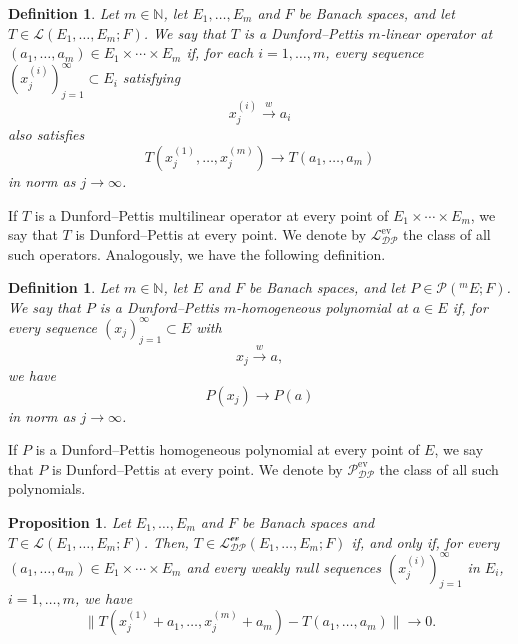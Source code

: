 \documentclass[12 pt]{article}%
\newtheorem{proposition}[theorem]{Proposition}
\newtheorem{final remark}[theorem]{Final Remark}
\newtheorem{definition}[theorem]{Definition}
\begin{document}
\begin{definition}\label{DPML}
	Let $m \in \mathbb{N}$, let $E_1,\dots, E_m$ and $F$ be Banach spaces, and let $T \in \mathcal{L}(E_1,\dots, E_m; F)$. We say that $T$ is a Dunford–Pettis $m$-linear operator at $(a_1,\dots, a_m) \in E_1 \times \cdots \times E_m$ if, for each $i=1,\dots,m$, every sequence $(x_j^{(i)})_{j=1}^\infty \subset E_i$ satisfying
	\[
	x_j^{(i)} \overset{w}{\longrightarrow} a_i
	\]
	also satisfies
	\[
	T(x_j^{(1)},\dots,x_j^{(m)}) \longrightarrow T(a_1,\dots,a_m)
	\]
	in norm as $j \to \infty$.
\end{definition}

If $T$ is a Dunford–Pettis multilinear operator at every point of $E_1 \times \cdots \times E_m$, we say that $T$ is Dunford–Pettis at every point. We denote by $\mathcal{L_{DP}^{\mathrm{ev}}}$ the class of all such operators. Analogously, we have the following definition.

\begin{definition}\label{DPPH}
	Let $m \in \mathbb{N}$, let $E$ and $F$ be Banach spaces, and let $P \in \mathcal{P}(^mE; F)$. We say that $P$ is a Dunford–Pettis $m$-homogeneous polynomial at $a \in E$ if, for every sequence $(x_j)_{j=1}^{\infty} \subset E$ with
	\begin{equation*}
		x_j \overset{w}{\longrightarrow} a,
	\end{equation*}
	we have
	\begin{equation*}
		P(x_j) \longrightarrow P(a)
	\end{equation*}
	in norm as $j \to \infty$.
\end{definition}

If $P$ is a Dunford–Pettis homogeneous polynomial at every point of $E$, we say that $P$ is Dunford–Pettis at every point. We denote by $\mathcal{P_{DP}^{\mathrm{ev}}}$ the class of all such polynomials.

\begin{proposition}
	Let $E_1,\dots, E_m$ and $F$ be Banach spaces and $T \in \mathcal{L}(E_1,\dots, E_m; F)$. Then, $T \in \mathcal{L_{DP}^{\text{ev}}}(E_1,\dots, E_m; F)$ if, and only if, for every $(a_1,\dots, a_m) \in E_1\times\cdots\times E_m$ and every weakly null sequences $(x_j^{(i)})_{j=1}^{\infty}$ in $E_i$, $i=1,\dots, m$, we have
	\begin{equation*}
		\|T(x_j^{(1)} + a_1,\dots, x_j^{(m)} + a_m) - T(a_1,\dots, a_m)\|\longrightarrow 0.
	\end{equation*}
\end{proposition}
\end{document}
